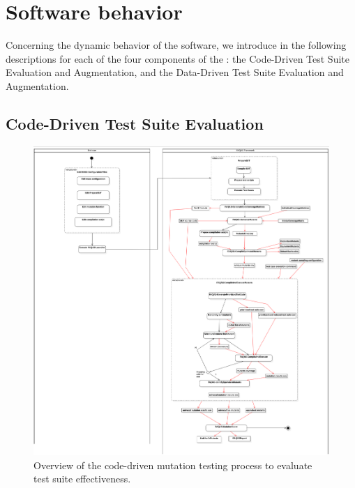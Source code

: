 
\section{Software behavior}

Concerning the dynamic behavior of the software, we introduce in the following descriptions for each of the four components of the \FAQAS: the Code-Driven Test Suite Evaluation and Augmentation, and the Data-Driven Test Suite Evaluation and Augmentation.

\subsection{Code-Driven Test Suite Evaluation}

\begin{figure}[h]
  \centering
	\includegraphics[width=\textwidth]{images/CodeDrivenTestSuiteEvaluation.png}
      \caption{Overview of the code-driven mutation testing process to evaluate test suite effectiveness.}
      \label{fig:process:codeDriven:evaluation}
\end{figure}


